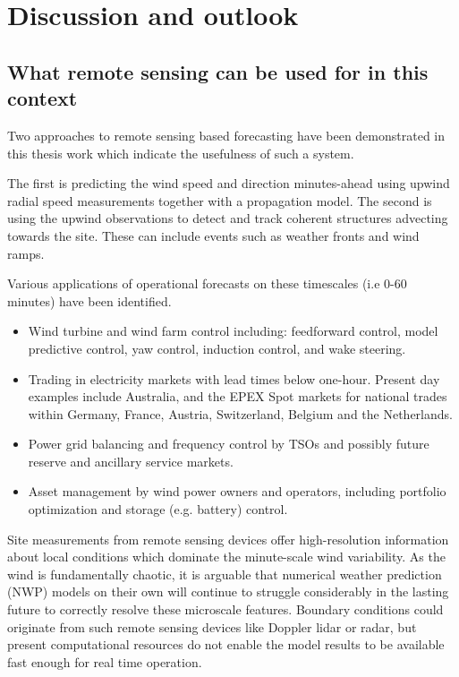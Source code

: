\chapter{Discussion and outlook}
\label{sec:discussion}

\clearpage
\section{What remote sensing can be used for in this context}
\label{sec:discussion_rs}
\bigskip

Two approaches to remote sensing based forecasting have been demonstrated in this thesis work which indicate the usefulness of such a system.

The first is predicting the wind speed and direction minutes-ahead using upwind radial speed measurements together with a propagation model. The second is using the upwind observations to detect and track coherent structures advecting towards the site. These can include events such as weather fronts and wind ramps.

Various applications of operational forecasts on these timescales (i.e 0-60 minutes) have been identified.

\begin{itemize}
    \item Wind turbine and wind farm control including: feedforward control, model predictive control, yaw control, induction control, and wake steering.
    \item Trading in electricity markets with lead times below one-hour. Present day examples include Australia, and the EPEX Spot markets for national trades within Germany, France, Austria, Switzerland, Belgium and the Netherlands.
    \item Power grid balancing and frequency control by TSOs and possibly future reserve and ancillary service markets.
    \item Asset management by wind power owners and operators, including portfolio optimization and storage (e.g. battery) control.
\end{itemize}

Site measurements from remote sensing devices offer high-resolution information about local conditions which dominate the minute-scale wind variability. As the wind is fundamentally chaotic, it is arguable that numerical weather prediction (NWP) models on their own will continue to struggle considerably in the lasting future to correctly resolve these microscale features. Boundary conditions could originate from such remote sensing devices like Doppler lidar or radar, but present computational resources do not enable the model results to be available fast enough for real time operation.

